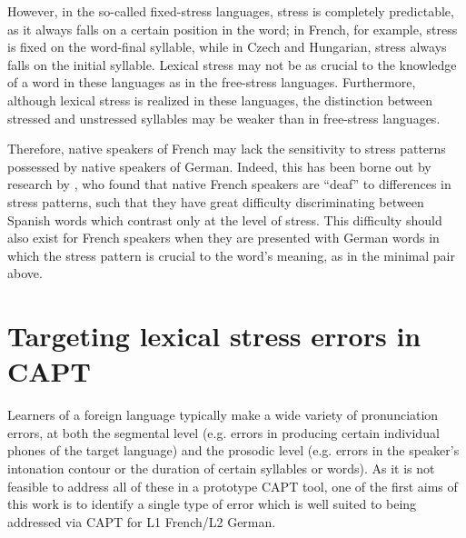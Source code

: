 			However, in the so-called fixed-stress languages, stress is completely predictable, as it always falls on a certain position in the word;
in French, for example, stress is fixed on the word-final syllable, while 
in Czech and Hungarian, stress always falls on the initial syllable. Lexical stress may not be as crucial to the knowledge of a word in these languages as in the free-stress languages. Furthermore, although lexical stress is realized in these languages, the distinction between stressed and unstressed syllables may be weaker than in free-stress languages.
			
		Therefore, native speakers of French may lack the sensitivity to stress patterns possessed by native speakers of German. Indeed, this has been borne out by research by \textcite{Dupoux2008},
  who found that native French speakers are ``deaf'' to differences in stress patterns, such that they have great difficulty discriminating between Spanish words which contrast only at the level of stress. This difficulty should also exist for French speakers when they are presented with German words in which the stress pattern is crucial to the word's meaning, as in the minimal pair above.
		
%		
%		
		
		
 \section{Targeting lexical stress errors in CAPT}
 \label{sec:bkgd:targeting}
 	Learners of a foreign language typically make a wide variety of pronunciation errors, at both the segmental level (e.g. errors in producing certain individual phones of the target language) and the prosodic level (e.g. errors in the speaker's intonation contour or the duration of certain syllables or words). 
 As it is not feasible to address all of these in a prototype CAPT tool, 
one of the first aims of this work is to identify a single type of error which is well suited to being addressed via CAPT for L1 French/L2 German.
	
